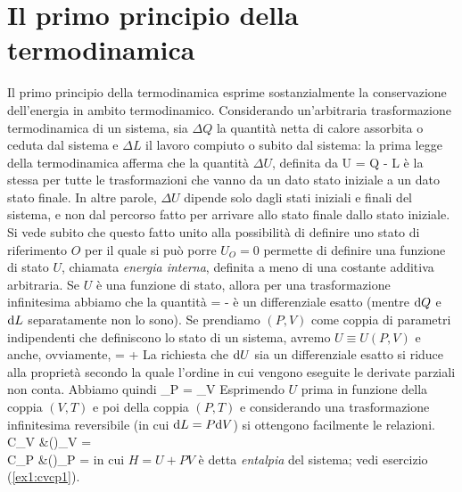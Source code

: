 \section{Il primo principio della termodinamica}
\label{sec1:primo}

Il primo principio della termodinamica esprime sostanzialmente la conservazione dell'energia in ambito termodinamico. Considerando un'arbitraria trasformazione termodinamica di un sistema, sia $\Delta Q$ la quantità netta di calore assorbita o ceduta dal sistema e $\Delta L$ il lavoro compiuto o subito dal sistema: la prima legge della termodinamica afferma che la quantità $\Delta U$, definita da
\be
\label{eq:DeltaU}
\Delta U = \Delta Q - \Delta L
\ee
è la stessa per tutte le trasformazioni che vanno da un dato stato iniziale a un dato stato finale. In altre parole, $\Delta U$ dipende solo dagli stati iniziali e finali del sistema, e non dal percorso fatto per arrivare allo stato finale dallo stato iniziale. Si vede subito che questo fatto unito alla possibilità di definire uno stato di riferimento $O$ per il quale si può porre $U_{O} = 0$ permette di definire una {funzione di stato} $U$, chiamata {\em energia interna}, definita a meno di una costante additiva arbitraria. Se $U$ è una funzione di stato, allora per una trasformazione infinitesima abbiamo che la quantità
\be
\label{eq:dU}
 =  - 
\ee
è un differenziale esatto (mentre ${\textrm d}Q$ e ${\textrm d}L$ separatamente non lo sono). Se prendiamo $(P,V)$ come coppia di parametri indipendenti che definiscono lo stato di un sistema, avremo $U\equiv U(P,V)$ e anche, ovviamente,
\be
\label{eq:dU-PV}
 =  + 
\ee
La richiesta che ${\textrm d}U$ sia un differenziale esatto si riduce alla proprietà secondo la quale l'ordine in cui vengono eseguite le derivate parziali non conta. Abbiamo quindi
\be
\label{eq:dU-PV-esatto}
_{P} = _{V}
\ee
Esprimendo $U$ prima in funzione della coppia $(V,T)$ e poi della coppia $(P,T)$ e considerando una trasformazione infinitesima reversibile (in cui ${\textrm d}L = P{\textrm d}V$) si ottengono facilmente le relazioni.
\bea
\label{eq:cvcp}
C_{V} &\equiv \left(\right)_{V} = \nonumber\\
C_{P} &\equiv \left(\right)_{P} =  
\eea
in cui $H = U + PV$ è detta {\em entalpia} del sistema; vedi esercizio (\ref{ex1:cvcp1}).

